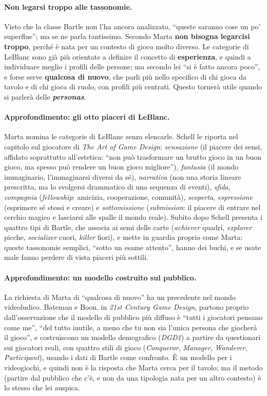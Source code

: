 \paragraph{Non legarsi troppo alle tassonomie.} Visto che la classe Bartle non l'ha ancora
analizzato, ``queste saranno cose un po' superflue''; ma se ne parla tantissimo. Secondo Marta
\textbf{non bisogna legarcisi troppo}, perché è nata per un contesto di gioco molto diverso.
Le categorie di LeBlanc sono già più orientate a definire il concetto di
\textbf{esperienza}, e quindi a individuare meglio i profili delle persone; ma secondo lei
``si è fatto ancora poco'', e forse serve \textbf{qualcosa di nuovo}, che parli più nello
specifico di chi gioca da tavolo e di chi gioca di ruolo, con profili più centrati. Questo
tornerà utile quando si parlerà delle \textbf{\emph{personas}}.

\paragraph{Approfondimento: gli otto piaceri di LeBlanc.} Marta nomina le categorie di
LeBlanc senza elencarle. Schell le riporta nel capitolo sul giocatore di \emph{The Art of
Game Design}: \emph{sensazione} (il piacere dei sensi, affidato soprattutto all'estetica:
``non può trasformare un brutto gioco in un buon gioco, ma spesso può rendere un buon gioco
migliore''), \emph{fantasia} (il mondo immaginario, l'immaginarsi diversi da sé),
\emph{narrativa} (non una storia lineare prescritta, ma lo svolgersi drammatico di una
sequenza di eventi), \emph{sfida}, \emph{compagnia} (\emph{fellowship}: amicizia,
cooperazione, comunità), \emph{scoperta}, \emph{espressione} (esprimere sé stessi e creare) e
\emph{sottomissione} (\emph{submission}: il piacere di entrare nel cerchio magico e lasciarsi
alle spalle il mondo reale). Subito dopo Schell presenta i quattro tipi di Bartle, che
associa ai semi delle carte (\emph{achiever} quadri, \emph{explorer} picche,
\emph{socializer} cuori, \emph{killer} fiori), e mette in guardia proprio come Marta: queste
tassonomie semplici, ``sotto un esame attento'', hanno dei buchi, e se usate male fanno
perdere di vista piaceri più sottili.

\paragraph{Approfondimento: un modello costruito sul pubblico.} La richiesta di Marta di
``qualcosa di nuovo'' ha un precedente nel mondo videoludico. Bateman e Boon, in \emph{21st
Century Game Design}, partono proprio dall'osservazione che il modello di pubblico più
diffuso è ``tutti i giocatori pensano come me'', ``del tutto inutile, a meno che tu non sia
l'unica persona che giocherà il gioco'', e costruiscono un modello demografico
(\emph{DGD1}) a partire da questionari sui giocatori reali, con quattro stili di gioco
(\emph{Conqueror}, \emph{Manager}, \emph{Wanderer}, \emph{Participant}), usando i dati di
Bartle come confronto. È un modello per i videogiochi, e quindi non è la risposta che Marta
cerca per il tavolo; ma il metodo (partire dal pubblico che c'è, e non da una tipologia nata
per un altro contesto) è lo stesso che lei auspica.

